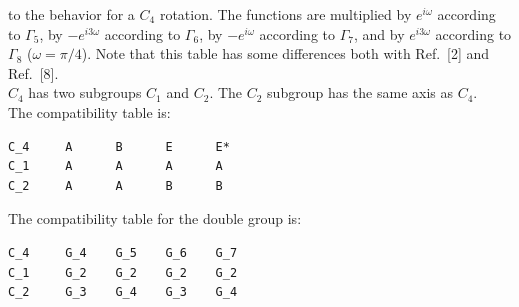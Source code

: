 \documentclass[12pt,a4paper]{article}
\begin{document}
to the behavior for a $C_4$ rotation. The functions are multiplied by 
$e^{i\omega}$ according to $\Gamma_5$, by $-e^{i3\omega}$ according to 
$\Gamma_6$, by $-e^{i\omega}$ according to $\Gamma_7$, and by $e^{i3\omega}$ 
according to $\Gamma_8$ ($\omega=\pi/4$). Note that this table has some
differences both with Ref.~[2] and Ref.~[8].\\
$C_4$ has two subgroups $C_1$ and $C_2$. The $C_2$ subgroup has the same axis
as $C_4$. \\
The compatibility table is:
\begin{verbatim}
C_4     A      B      E      E*  
C_1     A      A      A      A
C_2     A      A      B      B
\end{verbatim}
The compatibility table for the double group is:
\begin{verbatim}
C_4     G_4    G_5    G_6    G_7 
C_1     G_2    G_2    G_2    G_2
C_2     G_3    G_4    G_3    G_4
\end{verbatim}
\end{document}
